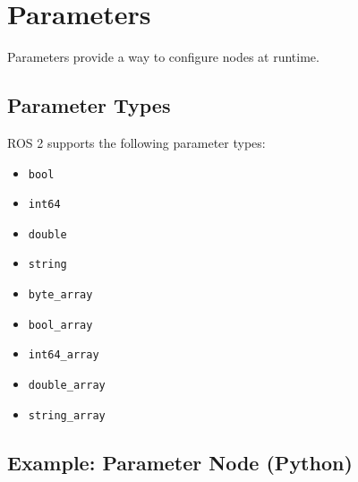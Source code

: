 \documentclass[a4paper,12pt]{book}
\newcommand{\code}[1]{\texttt{#1}}
\begin{document}
\chapter{Parameters}

Parameters provide a way to configure nodes at runtime.

\section{Parameter Types}

ROS 2 supports the following parameter types:
\begin{itemize}
\item \code{bool}
\item \code{int64}
\item \code{double}
\item \code{string}
\item \code{byte\_array}
\item \code{bool\_array}
\item \code{int64\_array}
\item \code{double\_array}
\item \code{string\_array}
\end{itemize}

\section{Example: Parameter Node (Python)}
\end{document}
